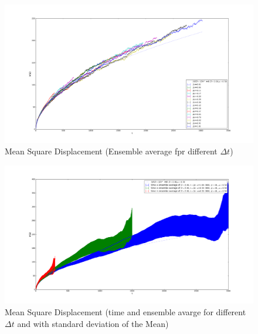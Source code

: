 \documentclass[
  a4paper,BCOR10mm,oneside,
  bibtotoc,idxtotoc,
  headsepline,footsepline,%
  fleqn,openbib
]{scrbook}
\begin{document}
\begin{figure}[h]
\includegraphics[width=\textwidth]{./msd_ensemble_dt_nostd_lin.pdf}
\caption{Mean Square Displacement (Ensemble average fpr different $\Delta t$)}
 \centering
\end{figure}

\begin{figure}[h]
\includegraphics[width=\textwidth]{./msd_time_ensemble_dt_lin.pdf}
\caption{Mean Square Displacement (time and ensemble avarge for different $ \Delta t$ and with standard deviation of the Mean)}
 \centering
\end{figure}
\end{document}
